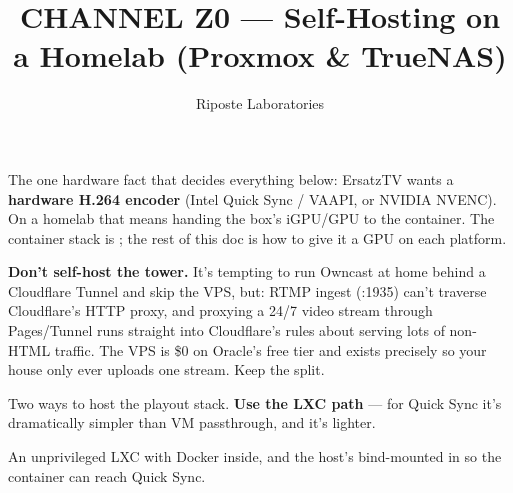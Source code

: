 \documentclass[fontpath=fonts/,logopath=logo/]{riposte-doc}
\title{CHANNEL Z0 — Self-Hosting on a Homelab (Proxmox \& TrueNAS)}
\author{Riposte Laboratories}
\date{}
\begin{document}
\ripmakehead

\riptoc

\begin{ripnote}
The one hardware fact that decides everything below: ErsatzTV wants a \textbf{hardware H.264 encoder} (Intel Quick Sync / VAAPI, or NVIDIA NVENC). On a homelab that means handing the box's iGPU/GPU to the container. The container stack is ; the rest of this doc is how to give it a GPU on each platform.
\end{ripnote}



\ripcodeopen
{}
\ripcodesizereset\ripcodeclose

\textbf{Don't self-host the tower.} It's tempting to run Owncast at home behind a Cloudflare Tunnel and skip the VPS, but: RTMP ingest (:1935) can't traverse Cloudflare's HTTP proxy, and proxying a 24/7 video stream through Pages/Tunnel runs straight into Cloudflare's rules about serving lots of non-HTML traffic. The VPS is \$0 on Oracle's free tier and exists precisely so your house only ever uploads one stream. Keep the split.



Two ways to host the playout stack. \textbf{Use the LXC path} — for Quick Sync it's dramatically simpler than VM passthrough, and it's lighter.



An unprivileged LXC with Docker inside, and the host's  bind-mounted in so the container can reach Quick Sync.
\end{document}

